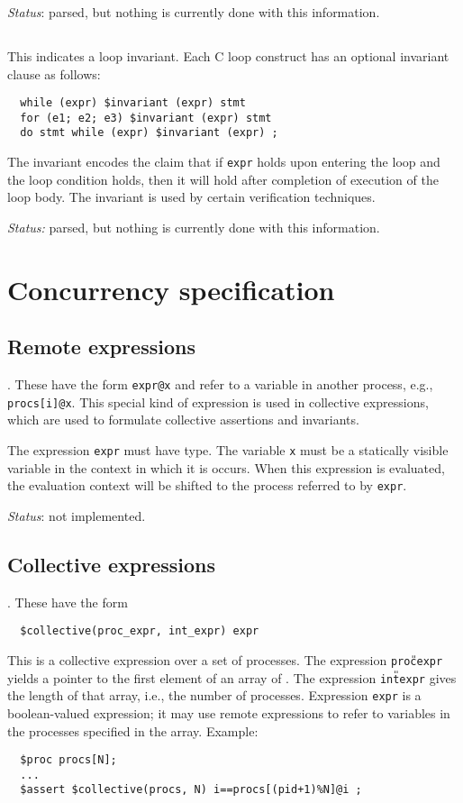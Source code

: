 \emph{Status}: parsed, but nothing is currently done with this
information.

\subsection{\cinvariant} This indicates a loop invariant.  Each C loop
construct has an optional invariant clause as follows:
\begin{verbatim}
  while (expr) $invariant (expr) stmt
  for (e1; e2; e3) $invariant (expr) stmt
  do stmt while (expr) $invariant (expr) ;
\end{verbatim}
The invariant encodes the claim that if \texttt{expr} holds upon
entering the loop and the loop condition holds, then it will hold
after completion of execution of the loop body.  The invariant is used
by certain verification techniques.

\emph{Status:} parsed, but nothing is currently done with this
information.



\section{Concurrency specification}

\subsection{Remote expressions}.  These have the form \verb!expr@x!
and refer to a variable in another process, e.g., \verb!procs[i]@x!.
This special kind of expression is used in collective expressions,
which are used to formulate collective assertions and invariants.

The expression \verb!expr! must have \cproc{} type.  The variable
\texttt{x} must be a statically visible variable in the context in
which it is occurs.  When this expression is evaluated, the evaluation
context will be shifted to the process referred to by \texttt{expr}.

\emph{Status}: not implemented.

\subsection{Collective expressions}.  These have the form
\begin{verbatim}
  $collective(proc_expr, int_expr) expr 
\end{verbatim}
This is a collective expression over a set of processes.  The
expression \texttt{proc{\U}expr} yields a pointer to the first element
of an array of \cproc.  The expression \texttt{int{\U}expr} gives the
length of that array, i.e., the number of processes.  Expression
\texttt{expr} is a boolean-valued expression; it may use remote
expressions to refer to variables in the processes specified in the
array.  Example:
\begin{verbatim}
  $proc procs[N];
  ...
  $assert $collective(procs, N) i==procs[(pid+1)%N]@i ;
\end{verbatim}

